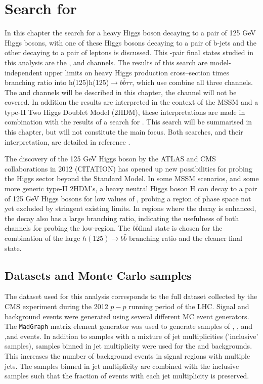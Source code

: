 \chapter{\texorpdfstring{Search for \Htohhtobbtautau}{Search for H -> hh -> bbtautau}}
\label{sec:hhh}

In this chapter the search for a heavy Higgs boson decaying to a pair of 125 GeV Higgs bosons, with one of these Higgs bosons decaying to 
a pair of b-jets and the other decaying to a pair of \Ptau leptons is discussed. This \Pgt-pair final states studied in this analysis
are the \etau, \mutau and \tautau channels. The results of this search are model-independent
upper limits on heavy Higgs production cross--section times branching ratio into h(125)h(125)$\rightarrow b\bar{b} \tau\tau$, which use
combine all three channels. The \etau and \mutau channels will be described in this chapter, the \tautau channel will not
be covered. In addition  the results are interpreted in the context of the MSSM and a type-II Two Higgs Doublet Model (2HDM), 
these interpretations are made in combination with the results of a search for \AtoZhtolltautau. 
This search will be summarised in this chapter, but will not constitute the main focus.
Both searches, and their interpretation, are detailed in reference \cite{CMS-HIG-14-034}.

The discovery of the 125 GeV Higgs boson by the ATLAS and CMS collaborations in 2012 (CITATION) has opened up
new possibilities for probing the Higgs sector beyond the Standard Model. In some MSSM scenarios, and some more
generic type-II 2HDM's, a heavy neutral Higgs boson H can decay to a pair of 125 GeV Higgs bosons for low values
of \tanb, probing a region of phase space not yet excluded by stringent existing limits. In regions where
the decay \Htohh is enhanced, the \AtoZh decay also has a large branching ratio, indicating the usefulness
of both channels for probing the low-\tanb region. The $b\bar{b}$\tautau final state is chosen for the combination
of the large $h(125) \rightarrow b\bar{b}$ branching ratio and the cleaner \htotautau final state.

\section{Datasets and Monte Carlo samples}
\label{sec:hhh_datasets}
The dataset used for this analysis corresponds to the full dataset collected by the CMS experiment during the 2012 $p-p$ 
running period of the LHC. 
Signal and background events were generated using several different MC event generators. The \texttt{MadGraph}
\cite{madgraph} matrix element generator was used to generate samples of \Wjets, \Zellell, \ttbar and \ZZ ,\WZ and \WW
events. In addition to samples with a mixture of jet multiplicities ('inclusive' samples), samples binned in jet multiplicity
were used for the \Wjets and \Zellell backgrounds. This increases the number of background events
in signal regions with multiple jets. The samples binned in jet multiplicity are combined with the
inclusive samples such that the fraction of events with each jet multiplicity is preserved.

